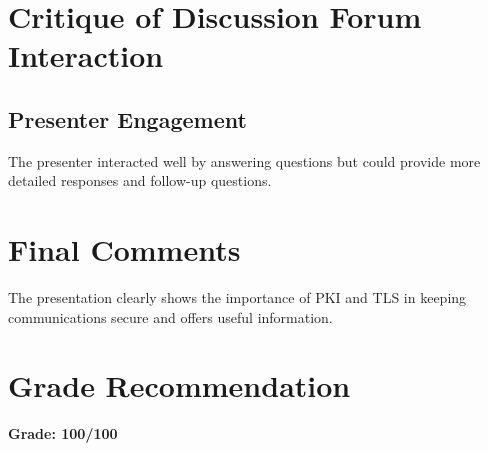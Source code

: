 \documentclass{article}
\begin{document}
\section{Critique of Discussion Forum Interaction}
\subsection{Presenter Engagement}
The presenter interacted well by answering questions but could provide more detailed responses and follow-up questions.

\section{Final Comments}
The presentation clearly shows the importance of PKI and TLS in keeping communications secure and offers useful information.

\section{Grade Recommendation}
\textbf{Grade: 100/100}
\end{document}
